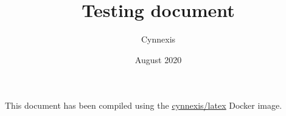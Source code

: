 \documentclass[12pt,a4]{article}
\title{Testing document}
\author{Cynnexis}
\date{August 2020}
\begin{document}
\maketitle

This document has been compiled using the \href{https://hub.docker.com/r/cynnexis/latex}{\underline{cynnexis/latex}} Docker image.
\end{document}
